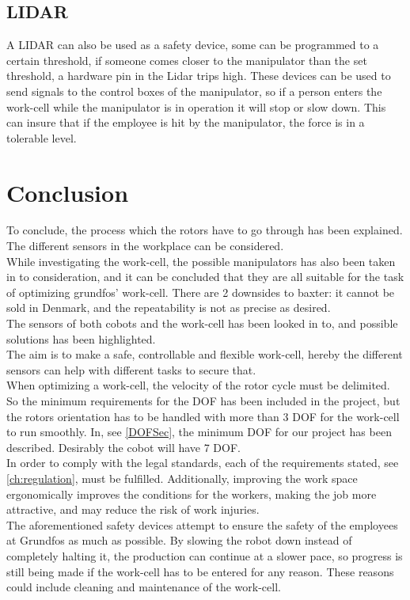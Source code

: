 \subsection{LIDAR}
A LIDAR can also be used as a safety device\cite{LIDAR}, some can be programmed to a certain threshold, if someone comes closer to the manipulator than the set threshold, a hardware pin in the Lidar trips high. These devices can be used to send signals to the control boxes of the manipulator, so if a person enters the work-cell while the manipulator is in operation it will stop or slow down. This can insure that if the employee is hit by the manipulator, the force is in a tolerable level.\\



\section{Conclusion}


To conclude, the process which the rotors have to go through has been explained. The different sensors in the workplace can be considered.\\
While investigating the work-cell, the possible manipulators has also been taken in to consideration, and it can be concluded that they are all suitable for the task of optimizing grundfos' work-cell. There are 2 downsides to baxter: it cannot be sold in Denmark, and the repeatability is not as precise as desired.\\
The sensors of both cobots and the work-cell has been looked in to, and possible solutions has been highlighted.\\
The aim is to make a safe, controllable and flexible work-cell, hereby the different sensors can help with different tasks to secure that.\\
When optimizing a work-cell, the velocity of the rotor cycle must be delimited. So the minimum requirements for the DOF has been included in the project, but the rotors orientation has to be handled with more than 3 DOF for the work-cell to run smoothly. In, see \ref{DOFSec}, the minimum DOF for our project has been described. Desirably the cobot will have 7 DOF.\\
In order to comply with the legal standards, each of the requirements stated, see \ref{ch:regulation}, must be fulfilled. Additionally, improving the work space ergonomically improves the conditions for the workers, making the job more attractive, and may reduce the risk of work injuries.\\
The aforementioned safety devices attempt to ensure the safety of the employees at Grundfos as much as possible. By slowing the robot down instead of completely halting it, the production can continue at a slower pace, so progress is still being made if the work-cell has to be entered for any reason. These reasons could include cleaning and maintenance of the work-cell.\\



